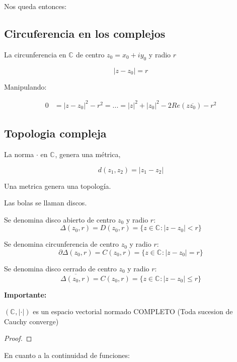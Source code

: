 Nos queda entonces:


\subsection{Circuferencia en los complejos}

\begin{definicion}
  La circunferencia en \(\mathbb{C}^{}\) de centro \(z_0=x_0+iy_0\) y radio \(r\)
  
  \begin{equation}
    |z-z_0| = r
  \end{equation}

  Manipulando:

\end{definicion}

\begin{eqnarray*} %
  0 & = |z-z_0|^2 -r^2 = ... = |z|^2+|z_0|^2-2 Re(z\overline{z_0}) - r^2
\end{eqnarray*}

\subsection{Topologia compleja}
La norma \( \cdot \) en \(\mathbb{C}^{}\), genera una métrica,

\[d(z_1,z_2) = |z_1 - z_2|\]

Una metrica genera una topología.

Las bolas se llaman discos.

\begin{definicion}
  Se denomina disco abierto de centro \(z_0\) y radio \(r\):
  \[ \Delta (z_0, r) = D(z_0,r) = \{z \in \mathbb{C}^{} : |z-z_0|< r\}\]
\end{definicion}
\begin{definicion}[Circuferencia]
  Se denomina circunferencia de centro \(z_0\) y radio \(r\):
  \[ \partial \Delta (z_0, r) = C(z_0,r) = \{z \in \mathbb{C}^{} : |z-z_0| = r\}\]
\end{definicion}
\begin{definicion}
  Se denomina disco cerrado de centro \(z_0\) y radio \(r\):
  \[ \overline{\Delta (z_0, r) }= C(z_0,r) = \{z \in \mathbb{C}^{} : |z-z_0| \leq r\}\]
\end{definicion}

\textbf{Importante: }

\((\mathbb{C}^{}, |\cdot|)\) es un espacio vectorial normado COMPLETO (Toda sucesion de Cauchy converge)

\begin{proof}
\end{proof}

En cuanto a la continuidad de funciones:





